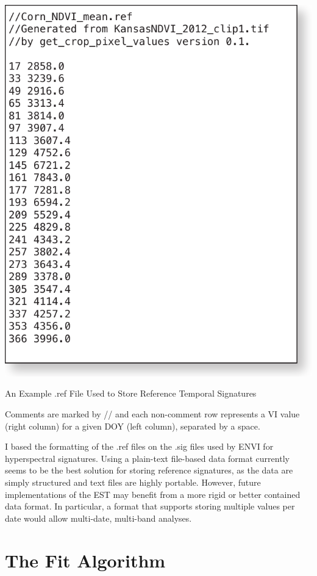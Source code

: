 \begin{ssfigure}
  \centering
  \includegraphics[scale=0.75]{Graphics/reffile.pdf}
  \caption{An Example .ref File Used to Store Reference Temporal Signatures}
  \medskip
  \small
  Comments are marked by // and each non-comment row represents a VI value (right column) for a given DOY (left column), separated by a space.
  \label{fig:reffile}
\end{ssfigure}

I based the formatting of the .ref files on the .sig files used by ENVI for hyperspectral signatures. Using a plain-text file-based data format currently seems to be the best solution for storing reference signatures, as the data are simply structured and text files are highly portable. However, future implementations of the EST may benefit from a more rigid or better contained data format. In particular, a format that supports storing multiple values per date would allow multi-date, multi-band analyses.


\section{The Fit Algorithm}
\label{appendix:tools:fit}

